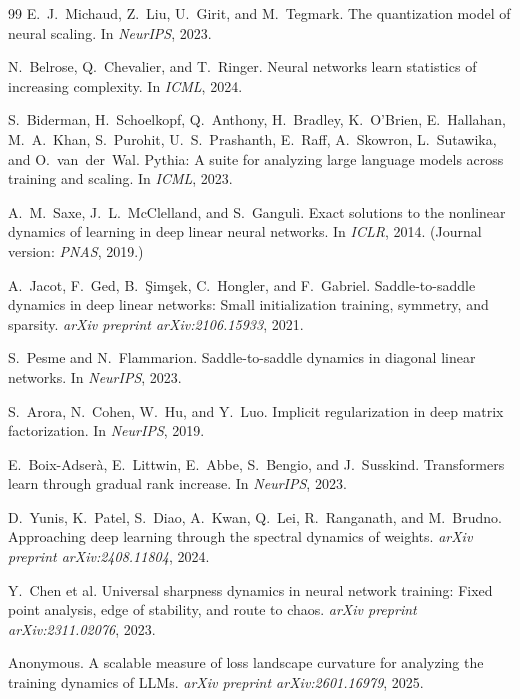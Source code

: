 \documentclass{article}
\theoremstyle{definition}
\begin{document}
\begin{thebibliography}{99}
E.~J.~Michaud, Z.~Liu, U.~Girit, and M.~Tegmark.
\newblock The quantization model of neural scaling.
\newblock In \emph{NeurIPS}, 2023.

N.~Belrose, Q.~Chevalier, and T.~Ringer.
\newblock Neural networks learn statistics of increasing complexity.
\newblock In \emph{ICML}, 2024.

S.~Biderman, H.~Schoelkopf, Q.~Anthony, H.~Bradley, K.~O'Brien, E.~Hallahan, M.~A.~Khan, S.~Purohit, U.~S.~Prashanth, E.~Raff, A.~Skowron, L.~Sutawika, and O.~van~der~Wal.
\newblock Pythia: A suite for analyzing large language models across training and scaling.
\newblock In \emph{ICML}, 2023.

A.~M.~Saxe, J.~L.~McClelland, and S.~Ganguli.
\newblock Exact solutions to the nonlinear dynamics of learning in deep linear neural networks.
\newblock In \emph{ICLR}, 2014. (Journal version: \emph{PNAS}, 2019.)

A.~Jacot, F.~Ged, B.~\c{S}im\c{s}ek, C.~Hongler, and F.~Gabriel.
\newblock Saddle-to-saddle dynamics in deep linear networks: Small initialization training, symmetry, and sparsity.
\newblock \emph{arXiv preprint arXiv:2106.15933}, 2021.

S.~Pesme and N.~Flammarion.
\newblock Saddle-to-saddle dynamics in diagonal linear networks.
\newblock In \emph{NeurIPS}, 2023.

S.~Arora, N.~Cohen, W.~Hu, and Y.~Luo.
\newblock Implicit regularization in deep matrix factorization.
\newblock In \emph{NeurIPS}, 2019.

E.~Boix-Adser\`a, E.~Littwin, E.~Abbe, S.~Bengio, and J.~Susskind.
\newblock Transformers learn through gradual rank increase.
\newblock In \emph{NeurIPS}, 2023.

D.~Yunis, K.~Patel, S.~Diao, A.~Kwan, Q.~Lei, R.~Ranganath, and M.~Brudno.
\newblock Approaching deep learning through the spectral dynamics of weights.
\newblock \emph{arXiv preprint arXiv:2408.11804}, 2024.

Y.~Chen et al.
\newblock Universal sharpness dynamics in neural network training: Fixed point analysis, edge of stability, and route to chaos.
\newblock \emph{arXiv preprint arXiv:2311.02076}, 2023.

Anonymous.
\newblock A scalable measure of loss landscape curvature for analyzing the training dynamics of {LLMs}.
\newblock \emph{arXiv preprint arXiv:2601.16979}, 2025.


\end{thebibliography}
\end{document}
